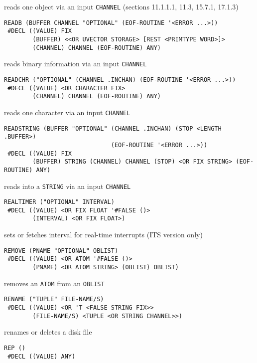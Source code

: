 \documentclass[a4paper,]{article}
\begin{document}
reads one object via an input \texttt{CHANNEL} (sections 11.1.1.1, 11.3, 15.7.1, 17.1.3)

\begin{verbatim}
READB (BUFFER CHANNEL "OPTIONAL" (EOF-ROUTINE '<ERROR ...>))
 #DECL ((VALUE) FIX
        (BUFFER) <<OR UVECTOR STORAGE> [REST <PRIMTYPE WORD>]>
        (CHANNEL) CHANNEL (EOF-ROUTINE) ANY)
\end{verbatim}

reads binary information via an input \texttt{CHANNEL}

\begin{verbatim}
READCHR ("OPTIONAL" (CHANNEL .INCHAN) (EOF-ROUTINE '<ERROR ...>))
 #DECL ((VALUE) <OR CHARACTER FIX>
        (CHANNEL) CHANNEL (EOF-ROUTINE) ANY)
\end{verbatim}

reads one character via an input \texttt{CHANNEL}

\begin{verbatim}
READSTRING (BUFFER "OPTIONAL" (CHANNEL .INCHAN) (STOP <LENGTH .BUFFER>)
                              (EOF-ROUTINE '<ERROR ...>))
 #DECL ((VALUE) FIX
        (BUFFER) STRING (CHANNEL) CHANNEL (STOP) <OR FIX STRING> (EOF-ROUTINE) ANY)
\end{verbatim}

reads into a \texttt{STRING} via an input \texttt{CHANNEL}

\begin{verbatim}
REALTIMER ("OPTIONAL" INTERVAL)
 #DECL ((VALUE) <OR FIX FLOAT '#FALSE ()>
        (INTERVAL) <OR FIX FLOAT>)
\end{verbatim}

sets or fetches interval for real-time interrupts (ITS version only)

\begin{verbatim}
REMOVE (PNAME "OPTIONAL" OBLIST)
 #DECL ((VALUE) <OR ATOM '#FALSE ()>
        (PNAME) <OR ATOM STRING> (OBLIST) OBLIST)
\end{verbatim}

removes an \texttt{ATOM} from an \texttt{OBLIST}

\begin{verbatim}
RENAME ("TUPLE" FILE-NAME/S)
 #DECL ((VALUE) <OR 'T <FALSE STRING FIX>>
        (FILE-NAME/S) <TUPLE <OR STRING CHANNEL>>)
\end{verbatim}

renames or deletes a disk file

\begin{verbatim}
REP ()
 #DECL ((VALUE) ANY)
\end{verbatim}
\end{document}
